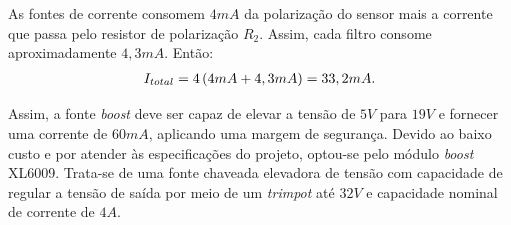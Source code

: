 \documentclass[
	12pt,				%
	openright,			%
	twoside,			%
	a4paper,			%
	english,			%
	french,				%
	spanish,			%
	brazil,				%
	]{abntex2}
\begin{document}
\begin{apendicesenv}
	As fontes de corrente consomem $4mA$ da polarização do sensor
	mais a corrente que passa pelo resistor de polarização $R_2$.
	Assim, cada filtro consome aproximadamente $4,3mA$. Então:
	\begin{gather*}
		I_{total} = 4\* \left(4mA + 4,3mA\right) = 33,2mA.
	\end{gather*}

	Assim, a fonte \textit{boost} deve ser capaz de elevar a tensão
	de $5V$ para $19V$ e fornecer uma corrente de $60mA$, aplicando uma
	margem de segurança. Devido ao baixo custo e por atender às
	especificações do projeto, optou-se pelo módulo \textit{boost}
	XL6009. Trata-se de uma fonte chaveada elevadora de tensão com
	capacidade de regular a tensão de saída por meio de um
	\textit{trimpot} até $32V$ e capacidade nominal de corrente de $4A$.

\end{apendicesenv}







\end{document}
